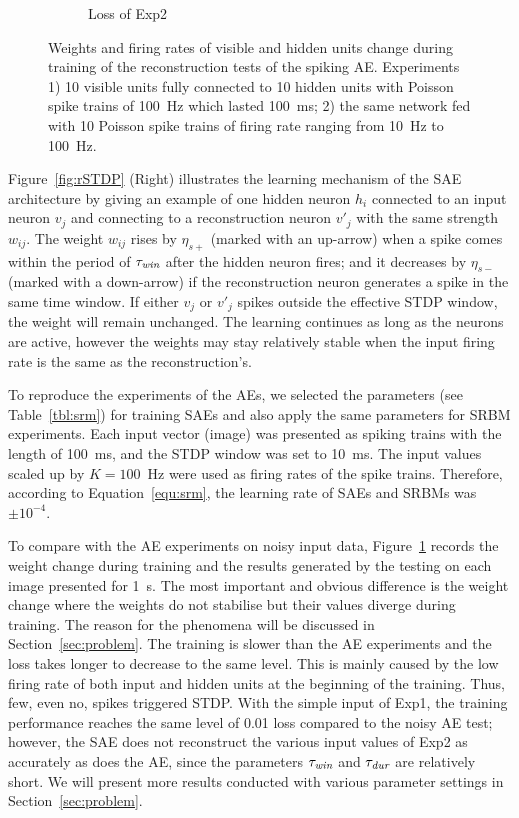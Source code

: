 \begin{figure}
\begin{subfigure}[t]{0.48\textwidth}
		\caption{Loss of Exp2}
	\end{subfigure}
	\caption[SAE training of the reconstruction tests.]{Weights and firing rates of visible and hidden units change during training of the reconstruction tests of the spiking AE. 
		Experiments 1) 10 visible units fully connected to 10 hidden units with Poisson spike trains of 100~Hz which lasted 100~ms; 2) the same network fed with 10 Poisson spike trains of firing rate ranging from 10~Hz to 100~Hz.}
	\label{fig:SAE_orig}
\end{figure}

Figure~\ref{fig:rSTDP} (Right) illustrates the learning mechanism of the SAE architecture by giving an example of one hidden neuron $h_i$ connected to an input neuron $v_j$ and connecting to a reconstruction neuron $v'_j$ with the same strength $w_{ij}$.
The weight $w_{ij}$ rises by $\eta_{s+}$ (marked with an up-arrow) when a spike comes within the period of $\tau_{\textit{\textrm{win}}}$ after the hidden neuron fires;
and it decreases by $\eta_{s-}$ (marked with a down-arrow) if the reconstruction neuron generates a spike in the same time window.
If either $v_j$ or $v'_j$ spikes outside the effective STDP window, the weight will remain unchanged.
The learning continues as long as the neurons are active, however the weights may stay relatively stable when the input firing rate is the same as the reconstruction's.

To reproduce the experiments of the AEs, we selected the parameters (see Table~\ref{tbl:srm}) for training SAEs and also apply the same parameters for SRBM experiments.
Each input vector (image) was presented as spiking trains with the length of 100~ms, and the STDP window was set to 10~ms.
The input values scaled up by $K=100$~Hz were used as firing rates of the spike trains.
Therefore, according to Equation~\ref{equ:srm}, the learning rate of SAEs and SRBMs was $\pm 10^{-4}$.

To compare with the AE experiments on noisy input data, Figure~\ref{fig:SAE_orig} records the weight change during training and the results generated by the testing on each image presented for 1~s.
The most important and obvious difference is the weight change where the weights do not stabilise but their values diverge during training.
The reason for the phenomena will be discussed in Section~\ref{sec:problem}.
The training is slower than the AE experiments and the loss takes longer to decrease to the same level.
This is mainly caused by the low firing rate of both input and hidden units at the beginning of the training.
Thus, few, even no, spikes triggered STDP.
With the simple input of Exp1, the training performance reaches the same level of 0.01 loss compared to the noisy AE test;
however, the SAE does not reconstruct the various input values of Exp2 as accurately as does the AE, since the parameters $\tau_{\textit{\textrm{win}}}$ and $\tau_{\textit{\textrm{dur}}}$ are relatively short.
We will present more results conducted with various parameter settings in Section~\ref{sec:problem}.

